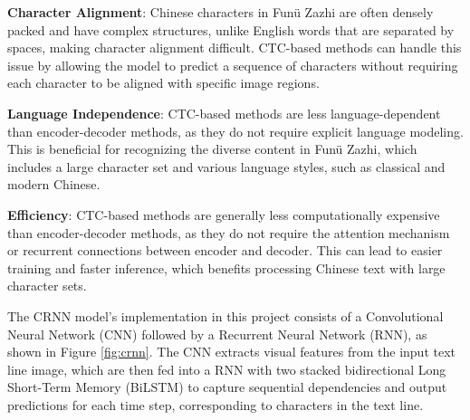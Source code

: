 \documentclass[12pt,twoside]{report}
\begin{document}
\textbf{Character Alignment}: Chinese characters in Funü Zazhi are often densely packed and have complex structures, unlike English words that are separated by spaces, making character alignment difficult. CTC-based methods can handle this issue by allowing the model to predict a sequence of characters without requiring each character to be aligned with specific image regions.

\textbf{Language Independence}: CTC-based methods are less language-dependent than encoder-decoder methods, as they do not require explicit language modeling. This is beneficial for recognizing the diverse content in Funü Zazhi, which includes a large character set and various language styles, such as classical and modern Chinese.

\textbf{Efficiency}: CTC-based methods are generally less computationally expensive than encoder-decoder methods, as they do not require the attention mechanism or recurrent connections between encoder and decoder. This can lead to easier training and faster inference, which benefits processing Chinese text with large character sets.

The CRNN \cite{shi2016end} model's implementation in this project consists of a Convolutional Neural Network (CNN) followed by a Recurrent Neural Network (RNN), as shown in Figure \ref{fig:crnn}. The CNN extracts visual features from the input text line image, which are then fed into a RNN with two stacked bidirectional Long Short-Term Memory (BiLSTM) to capture sequential dependencies and output predictions for each time step, corresponding to characters in the text line.
\end{document}

